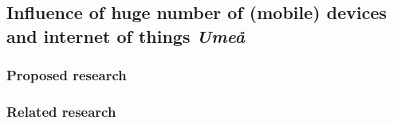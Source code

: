 \subsection{Influence of huge number of (mobile) devices and internet of things \emph{Umeå} }
\subsubsection{Proposed research}
\subsubsection{Related research}
